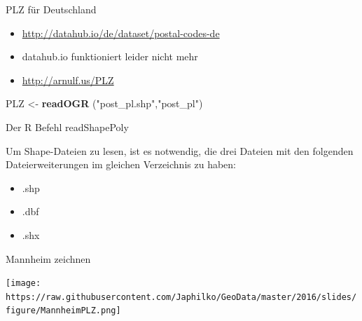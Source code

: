 \documentclass[ignorenonframetext,]{beamer}
\newenvironment{Shaded}{\begin{snugshade}}{\end{snugshade}}
\newcommand{\KeywordTok}[1]{\textcolor[rgb]{0.13,0.29,0.53}{\textbf{#1}}}
\newcommand{\NormalTok}[1]{#1}
\newcommand{\StringTok}[1]{\textcolor[rgb]{0.31,0.60,0.02}{#1}}
\providecommand{\tightlist}{%
  \setlength{\itemsep}{0pt}\setlength{\parskip}{0pt}}
\begin{document}
\begin{frame}[fragile]{PLZ für Deutschland}
\protect\hypertarget{plz-fur-deutschland}{}

\begin{itemize}
\item
  \url{http://datahub.io/de/dataset/postal-codes-de}
\item
  datahub.io funktioniert leider nicht mehr
\item
  \url{http://arnulf.us/PLZ}
\end{itemize}

\begin{Shaded}
\begin{Highlighting}[]
\NormalTok{PLZ <-}\StringTok{ }\KeywordTok{readOGR}\NormalTok{ (}\StringTok{"post_pl.shp"}\NormalTok{,}\StringTok{"post_pl"}\NormalTok{)}
\end{Highlighting}
\end{Shaded}

\end{frame}

\begin{frame}{Der R Befehl readShapePoly}
\protect\hypertarget{der-r-befehl-readshapepoly}{}

Um Shape-Dateien zu lesen, ist es notwendig, die drei Dateien mit den
folgenden Dateierweiterungen im gleichen Verzeichnis zu haben:

\begin{itemize}
\tightlist
\item
  .shp
\item
  .dbf
\item
  .shx
\end{itemize}

\end{frame}

\begin{frame}{Mannheim zeichnen}
\protect\hypertarget{mannheim-zeichnen}{}

\texttt{[image: https://raw.githubusercontent.com/Japhilko/GeoData/master/2016/slides/figure/MannheimPLZ.png]}

\end{frame}
\end{document}
